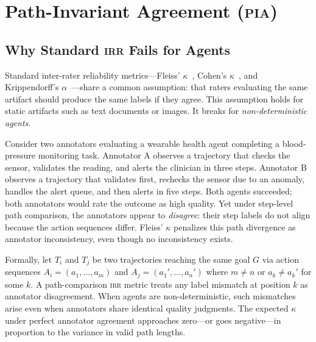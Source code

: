 \documentclass{article}
\newcommand{\PIA}{\textsc{pia}}          %
\begin{document}
\section{Path-Invariant Agreement (\PIA{})}
\label{sec:pia}

\subsection{Why Standard \textsc{irr} Fails for Agents}
\label{sec:pia:failure}

Standard inter-rater reliability metrics---Fleiss' $\kappa$~\cite{fleiss1971},
Cohen's $\kappa$~\cite{cohen1960}, and Krippendorff's
$\alpha$~\cite{krippendorff2011}---share a common assumption: that raters
evaluating the same artifact should produce the same labels if they agree.
This assumption holds for static artifacts such as text documents or images.
It breaks for \emph{non-deterministic agents}.

Consider two annotators evaluating a wearable health agent completing a
blood-pressure monitoring task.
%
Annotator A observes a trajectory that checks the sensor, validates the
reading, and alerts the clinician in three steps.
%
Annotator B observes a trajectory that validates first, rechecks the sensor
due to an anomaly, handles the alert queue, and then alerts in five steps.
%
Both agents succeeded; both annotators would rate the outcome as high quality.
%
Yet under step-level path comparison, the annotators appear to \emph{disagree}:
their step labels do not align because the action sequences differ.
%
Fleiss' $\kappa$ penalizes this path divergence as annotator inconsistency,
even though no inconsistency exists.

Formally, let $T_i$ and $T_j$ be two trajectories reaching the same goal $G$
via action sequences $A_i = (a_1, \ldots, a_m)$ and
$A_j = (a_1', \ldots, a_n')$ where $m \neq n$ or $a_k \neq a_k'$ for some
$k$.
%
A path-comparison \textsc{irr} metric treats any label mismatch at position $k$
as annotator disagreement.
%
When agents are non-deterministic, such mismatches arise even when annotators
share identical quality judgments.
%
The expected $\kappa$ under perfect annotator agreement approaches zero---or
goes negative---in proportion to the variance in valid path lengths.
\end{document}
